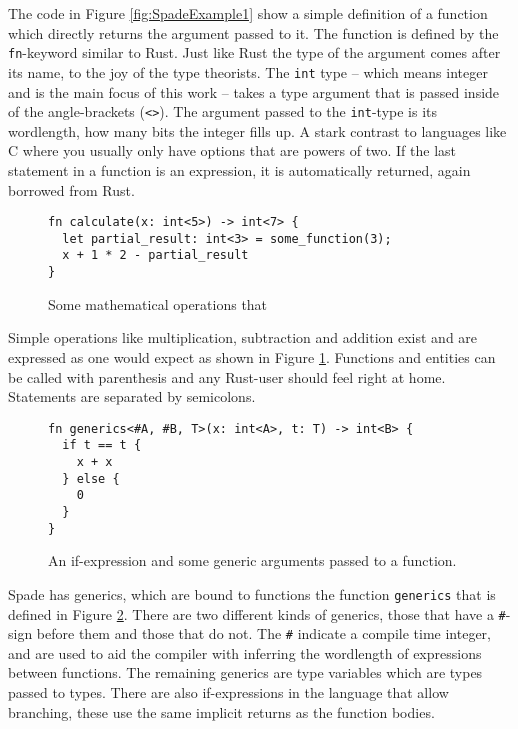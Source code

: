 The code in Figure \ref{fig:SpadeExample1} show a simple definition of a function which directly returns the argument passed to it. The function is defined by the \verb+fn+-keyword similar to Rust. Just like Rust the type of the argument comes after its name, to the joy of the type theorists. The \verb+int+ type -- which means integer and is the main focus of this work -- takes a type argument that is passed inside of the angle-brackets (\verb+<>+). The argument passed to the \verb+int+-type is its wordlength, how many bits the integer fills up. A stark contrast to languages like C where you usually only have options that are powers of two. If the last statement in a function is an expression, it is automatically returned, again borrowed from Rust.

\begin{figure}
\begin{verbatim}
fn calculate(x: int<5>) -> int<7> {
  let partial_result: int<3> = some_function(3);
  x + 1 * 2 - partial_result
}
\end{verbatim}
  \caption{Some mathematical operations that }
  \label{fig:SpadeExampleOps}
\end{figure}

Simple operations like multiplication, subtraction and addition exist and are expressed as one would expect as shown in Figure \ref{fig:SpadeExampleOps}. Functions and entities can be called with parenthesis and any Rust-user should feel right at home. Statements are separated by semicolons.

\begin{figure}
\begin{verbatim}
fn generics<#A, #B, T>(x: int<A>, t: T) -> int<B> {
  if t == t {
    x + x
  } else {
    0
  }
}
\end{verbatim}
  \caption{An if-expression and some generic arguments passed to a function.}
  \label{fig:SpadeExample2}
\end{figure}

Spade has generics, which are bound to functions the function \verb+generics+ that is defined in Figure \ref{fig:SpadeExample2}. There are two different kinds of generics, those that have a \verb+#+-sign before them and those that do not. The \verb+#+ indicate a compile time integer, and are used to aid the compiler with inferring the wordlength of expressions between functions. The remaining generics are type variables which are types passed to types. There are also if-expressions in the language that allow branching, these use the same implicit returns as the function bodies.

